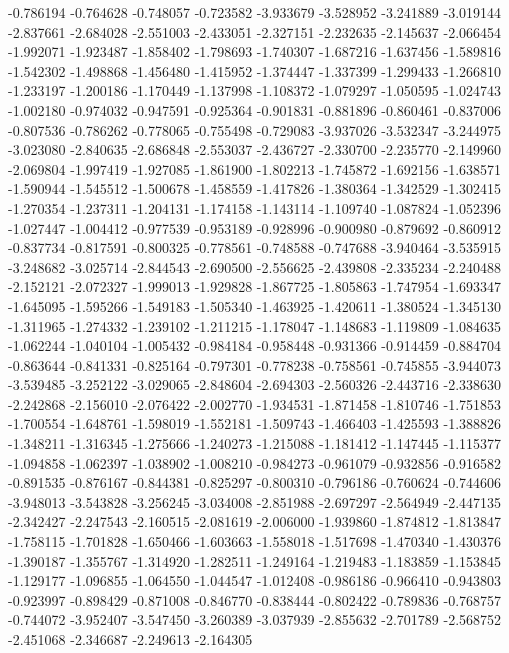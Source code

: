 -0.786194
-0.764628
-0.748057
-0.723582
-3.933679
-3.528952
-3.241889
-3.019144
-2.837661
-2.684028
-2.551003
-2.433051
-2.327151
-2.232635
-2.145637
-2.066454
-1.992071
-1.923487
-1.858402
-1.798693
-1.740307
-1.687216
-1.637456
-1.589816
-1.542302
-1.498868
-1.456480
-1.415952
-1.374447
-1.337399
-1.299433
-1.266810
-1.233197
-1.200186
-1.170449
-1.137998
-1.108372
-1.079297
-1.050595
-1.024743
-1.002180
-0.974032
-0.947591
-0.925364
-0.901831
-0.881896
-0.860461
-0.837006
-0.807536
-0.786262
-0.778065
-0.755498
-0.729083
-3.937026
-3.532347
-3.244975
-3.023080
-2.840635
-2.686848
-2.553037
-2.436727
-2.330700
-2.235770
-2.149960
-2.069804
-1.997419
-1.927085
-1.861900
-1.802213
-1.745872
-1.692156
-1.638571
-1.590944
-1.545512
-1.500678
-1.458559
-1.417826
-1.380364
-1.342529
-1.302415
-1.270354
-1.237311
-1.204131
-1.174158
-1.143114
-1.109740
-1.087824
-1.052396
-1.027447
-1.004412
-0.977539
-0.953189
-0.928996
-0.900980
-0.879692
-0.860912
-0.837734
-0.817591
-0.800325
-0.778561
-0.748588
-0.747688
-3.940464
-3.535915
-3.248682
-3.025714
-2.844543
-2.690500
-2.556625
-2.439808
-2.335234
-2.240488
-2.152121
-2.072327
-1.999013
-1.929828
-1.867725
-1.805863
-1.747954
-1.693347
-1.645095
-1.595266
-1.549183
-1.505340
-1.463925
-1.420611
-1.380524
-1.345130
-1.311965
-1.274332
-1.239102
-1.211215
-1.178047
-1.148683
-1.119809
-1.084635
-1.062244
-1.040104
-1.005432
-0.984184
-0.958448
-0.931366
-0.914459
-0.884704
-0.863644
-0.841331
-0.825164
-0.797301
-0.778238
-0.758561
-0.745855
-3.944073
-3.539485
-3.252122
-3.029065
-2.848604
-2.694303
-2.560326
-2.443716
-2.338630
-2.242868
-2.156010
-2.076422
-2.002770
-1.934531
-1.871458
-1.810746
-1.751853
-1.700554
-1.648761
-1.598019
-1.552181
-1.509743
-1.466403
-1.425593
-1.388826
-1.348211
-1.316345
-1.275666
-1.240273
-1.215088
-1.181412
-1.147445
-1.115377
-1.094858
-1.062397
-1.038902
-1.008210
-0.984273
-0.961079
-0.932856
-0.916582
-0.891535
-0.876167
-0.844381
-0.825297
-0.800310
-0.796186
-0.760624
-0.744606
-3.948013
-3.543828
-3.256245
-3.034008
-2.851988
-2.697297
-2.564949
-2.447135
-2.342427
-2.247543
-2.160515
-2.081619
-2.006000
-1.939860
-1.874812
-1.813847
-1.758115
-1.701828
-1.650466
-1.603663
-1.558018
-1.517698
-1.470340
-1.430376
-1.390187
-1.355767
-1.314920
-1.282511
-1.249164
-1.219483
-1.183859
-1.153845
-1.129177
-1.096855
-1.064550
-1.044547
-1.012408
-0.986186
-0.966410
-0.943803
-0.923997
-0.898429
-0.871008
-0.846770
-0.838444
-0.802422
-0.789836
-0.768757
-0.744072
-3.952407
-3.547450
-3.260389
-3.037939
-2.855632
-2.701789
-2.568752
-2.451068
-2.346687
-2.249613
-2.164305
